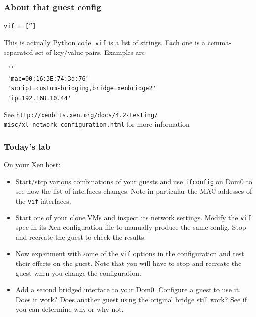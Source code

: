 \documentclass[10pt]{beamer}
\begin{document}
\begin{frame}[fragile]
  \frametitle{About that guest config}
  
  
   
   \texttt{vif = ['']}
  
  \vspace{5mm}
This is actually Python code. \texttt{vif} is a list of strings. Each one is a comma-separated  set of
key/value pairs. Examples are

\begin{verbatim}
 ''
 'mac=00:16:3E:74:3d:76'
 'script=custom-bridging,bridge=xenbridge2'
 'ip=192.168.10.44'
\end{verbatim}

See \texttt{http://xenbits.xen.org/docs/4.2-testing/ \\ misc/xl-network-configuration.html} for more information


\end{frame}

\begin{frame}
  \frametitle{Today's lab}

  On your Xen host:
\begin{itemize}
    \item Start/stop various combinations of your guests and use \texttt{ifconfig} on Dom0 to see
    how the list of interfaces changes. Note in particular the MAC addesses of the \texttt{vif} interfaces.
    \item Start one of your clone VMs and inspect its network settings. Modify the \texttt{vif} spec
    in its Xen configuration file to manually produce the same config. Stop and recreate the guest 
    to check the results.
    \item Now experiment with some of the \texttt{vif} options in the configuration and test their effects on 
    the guest. Note that you will have to stop and recreate the guest when you change the configuration.
    \item Add a second bridged interface to your Dom0. Configure a guest to use it. Does it work? Does 
    another guest using the original bridge still work? See if you can determine why or why not.
  \end{itemize}
\end{frame}
\end{document}
